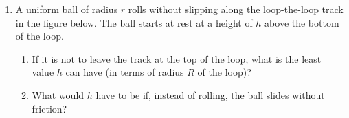 \documentclass{../../oss-apphys}
\begin{document}
\begin{enumerate}[leftmargin=15pt]

\item A uniform ball of radius $r$ rolls without slipping along the
  loop-the-loop track in the figure below. The ball starts at rest at a height
  of $h$ above the bottom of the loop.
  \begin{center}
  \end{center}
  \begin{enumerate}[itemsep=1.7in,topsep=0pt,leftmargin=15pt]
  \item\vspace{-.3in}If it is not to leave the track at the top of the loop,
    what is the least value $h$ can have (in terms of radius $R$ of the loop)?
  \item What would $h$ have to be if, instead of rolling, the ball slides
    without friction?
  \end{enumerate}
  \newpage
  

\end{enumerate}
\end{document}

